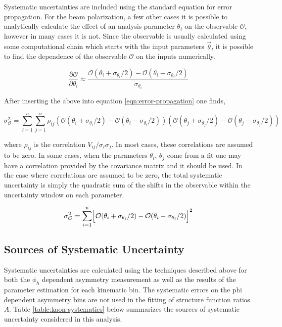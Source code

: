 
Systematic uncertainties are included using the standard equation for error propagation.  For the beam polarization, a few other cases it is possible to analytically calculate the effect of an analysis parameter $\theta_i$ on the observable $\mathcal{O}$, however in many cases it is not.  Since the observable is usually calculated using some computational chain which starts with the input parameters $\vec{\theta}$, it is possible to find the dependence of the observable $\mathcal{O}$ on the inputs numerically.

\begin{equation}
  \frac{\partial \mathcal{O}}{ \partial \theta_i} \approx \frac{\mathcal{O}(\theta_i + \sigma_{\theta_i}/2) - \mathcal{O}(\theta_i - \sigma_{\theta_i}/2)}{\sigma_{\theta_i}}
\end{equation}

After inserting the above into equation \ref{eqn:error-propagation} one finds,

\begin{equation}
  \sigma_{\mathcal{O}}^{2} = \sum_{i=1}^{n} \sum_{j=1}^{n} \rho_{ij} (\mathcal{O}(\theta_i + \sigma_{\theta_i}/2) - \mathcal{O}(\theta_i - \sigma_{\theta_i}/2)) (\mathcal{O}(\theta_j + \sigma_{\theta_j}/2) - \mathcal{O}(\theta_j - \sigma_{\theta_j}/2)) 
\end{equation}

where $\rho_{ij}$ is the correlation $V_{ij}/\sigma_i \sigma_j$.  In most cases, these correlations are assumed to be zero.  In some cases, when the parameters $\theta_i$, $\theta_j$ come from a fit one may have a correlation provided by the covariance matrix and it should be used.  In the case where correlations are assumed to be zero, the total systematic uncertainty is simply the quadratic sum of the shifts in the observable within the uncertainty window on each parameter.

\begin{equation}
  \sigma_{\mathcal{O}}^{2} = \sum_{i=1}^{n} \Bigl[ \mathcal{O}(\theta_i + \sigma_{\theta_i}/2) - \mathcal{O}(\theta_i - \sigma_{\theta_i}/2) \Bigr]^2
\end{equation}

\subsection{Sources of Systematic Uncertainty}
Systematic uncertainties are calculated using the techniques described above for both the $\phi_h$ dependent asymmetry measurement as well as the results of the parameter estimation for each kinematic bin.  The systematic errors on the phi dependent asymmetry bins are not used in the fitting of structure function ratios $A$.  Table \ref{table:kaon-systematics} below summarizes the sources of systematic uncertainty considered in this analysis.

